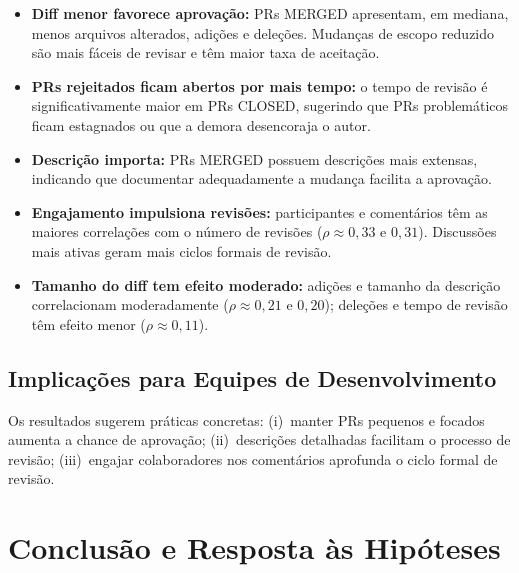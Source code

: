 \documentclass[10pt,a4paper,twocolumn]{article}
\begin{document}
\begin{itemize}
  \item \textbf{Diff menor favorece aprovação:} PRs MERGED apresentam, em
    mediana, menos arquivos alterados, adições e deleções. Mudanças de
    escopo reduzido são mais fáceis de revisar e têm maior taxa de
    aceitação.

  \item \textbf{PRs rejeitados ficam abertos por mais tempo:} o tempo de
    revisão é significativamente maior em PRs CLOSED, sugerindo que PRs
    problemáticos ficam estagnados ou que a demora desencoraja o autor.

  \item \textbf{Descrição importa:} PRs MERGED possuem descrições mais
    extensas, indicando que documentar adequadamente a mudança facilita
    a aprovação.

  \item \textbf{Engajamento impulsiona revisões:} participantes e
    comentários têm as maiores correlações com o número de revisões
    ($\rho \approx 0{,}33$ e $0{,}31$). Discussões mais ativas geram mais
    ciclos formais de revisão.

  \item \textbf{Tamanho do diff tem efeito moderado:} adições e tamanho
    da descrição correlacionam moderadamente ($\rho \approx 0{,}21$ e
    $0{,}20$); deleções e tempo de revisão têm efeito menor
    ($\rho \approx 0{,}11$).
\end{itemize}

\subsection{Implicações para Equipes de Desenvolvimento}

Os resultados sugerem práticas concretas: (i)~manter PRs pequenos e
focados aumenta a chance de aprovação; (ii)~descrições detalhadas
facilitam o processo de revisão; (iii)~engajar colaboradores nos
comentários aprofunda o ciclo formal de revisão.

\section{Conclusão e Resposta às Hipóteses}
\end{document}
